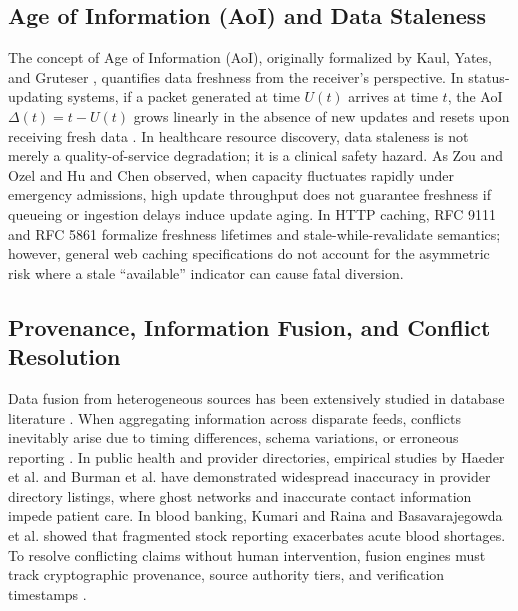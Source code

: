 \documentclass[conference]{IEEEtran}
\begin{document}
\subsection{Age of Information (AoI) and Data Staleness}
The concept of Age of Information (AoI), originally formalized by Kaul, Yates, and Gruteser \cite{kaul2012realtime,yates2021age}, quantifies data freshness from the receiver's perspective. In status-updating systems, if a packet generated at time $U(t)$ arrives at time $t$, the AoI $\Delta(t) = t - U(t)$ grows linearly in the absence of new updates and resets upon receiving fresh data \cite{sun2017update}. In healthcare resource discovery, data staleness is not merely a quality-of-service degradation; it is a clinical safety hazard. As Zou and Ozel \cite{zou2019relative} and Hu and Chen \cite{hu2020optimal} observed, when capacity fluctuates rapidly under emergency admissions, high update throughput does not guarantee freshness if queueing or ingestion delays induce update aging. In HTTP caching, RFC 9111 \cite{fielding2022caching,fielding2022semantics} and RFC 5861 \cite{nottingham2010stale} formalize freshness lifetimes and stale-while-revalidate semantics; however, general web caching specifications do not account for the asymmetric risk where a stale ``available'' indicator can cause fatal diversion.

\subsection{Provenance, Information Fusion, and Conflict Resolution}
Data fusion from heterogeneous sources has been extensively studied in database literature \cite{bleiholder2008data,dong2009data}. When aggregating information across disparate feeds, conflicts inevitably arise due to timing differences, schema variations, or erroneous reporting \cite{moreau2011open}. In public health and provider directories, empirical studies by Haeder et al. \cite{haeder2023state,haeder2024consumer,haeder2024persistence,haeder2025network} and Burman et al. \cite{burman2022provider,elton2024provider,anon2023provider} have demonstrated widespread inaccuracy in provider directory listings, where ghost networks and inaccurate contact information impede patient care. In blood banking, Kumari and Raina \cite{kumari2019reasons} and Basavarajegowda et al. \cite{basavarajegowda2026blood} showed that fragmented stock reporting exacerbates acute blood shortages. To resolve conflicting claims without human intervention, fusion engines must track cryptographic provenance, source authority tiers, and verification timestamps \cite{vermeulen2023trust,abedin2021data,liu2024data}.
\end{document}
